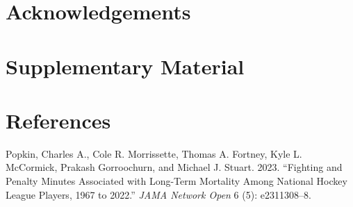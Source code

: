 \documentclass[
  12pt,
]{article}
\newlength{\cslhangindent}
\newenvironment{CSLReferences}[2] %
 {\begin{list}{}{%
  \setlength{\itemindent}{0pt}
  \setlength{\leftmargin}{0pt}
  \setlength{\parsep}{0pt}
  \ifodd #1
   \setlength{\leftmargin}{\cslhangindent}
   \setlength{\itemindent}{-1\cslhangindent}
  \fi
  \setlength{\itemsep}{#2\baselineskip}}}
 {\end{list}}
\begin{document}
\section*{Acknowledgements}\label{acknowledgements}

\section*{Supplementary Material}\label{supplementary-material}

\section*{References}\label{references}

\label{refs}
\begin{CSLReferences}{1}{0}
Popkin, Charles A., Cole R. Morrissette, Thomas A. Fortney, Kyle L.
McCormick, Prakash Gorroochurn, and Michael J. Stuart. 2023. {``Fighting
and Penalty Minutes Associated with Long-Term Mortality Among National
Hockey League Players, 1967 to 2022.''} \emph{JAMA Network Open} 6 (5):
e2311308--8.

\end{CSLReferences}
\end{document}
